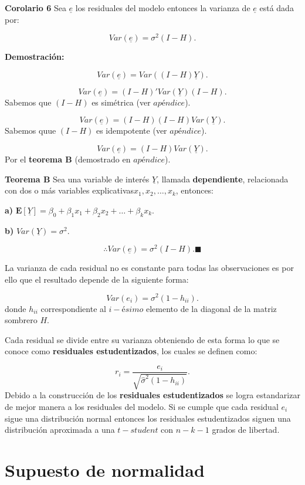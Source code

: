 \documentclass[
  a4paper,
  oneside,
  openany]{book}
\begin{document}
\textbf{Corolario 6} Sea \(\underline{e}\) los residuales del modelo entonces la varianza de \(\underline{e}\) está dada por:

\[Var(\underline{e})=\sigma^2(I-H).\]

\textbf{Demostración:}

\[Var(\underline{e})=Var((I-H)\underline{Y}).\]

\[Var(\underline{e})=(I-H)'Var(\underline{Y})(I-H).\]
Sabemos que \((I-H)\) es simétrica (ver \(apéndice\)).

\[Var(\underline{e})=(I-H)(I-H)Var(\underline{Y}).\]
Sabemos quue \((I-H)\) es idempotente (ver \(apéndice\)).

\[Var(\underline{e})=(I-H)Var(\underline{Y}).\]
Por el \textbf{teorema B} (demostrado en \(apéndice\)).

\textbf{Teorema B} Sea una variable de interés \(\underline{Y}\), llamada \textbf{dependiente}, relacionada con dos o más variables explicativas\(x_{1},x_{2},\ldots,x_{k}\),
entonces:

\textbf{a)} \(\mathbf{E}[\underline{Y}]= \beta_{0}+\beta_{1}x_{1}+\beta_{2}x_{2}+ \ldots + \beta_{k}x_{k}.\)

\textbf{b)} \(Var(\underline{Y})= \sigma^2.\)

\[\therefore Var(\underline{e})=\sigma^2(I-H). \blacksquare\]

La varianza de cada residual no es constante para todas las observaciones es por ello que el resultado depende de la siguiente forma:

\[Var(e_{i})=\sigma^2(1-h_{ii}).\]
donde \(h_{ii}\) correspondiente al \(i-ésimo\) elemento de la diagonal de la matriz sombrero \(H\).

Cada residual se divide entre su varianza obteniendo de esta forma lo que se conoce como \textbf{residuales estudentizados}, los cuales se definen como:

\[r_{i}=\frac{e_{i}}{\sqrt{\hat{\sigma}^2(1-h_{ii})}}.\]
Debido a la construcción de los \textbf{residuales estudentizados} se logra estandarizar de mejor manera a los residuales del modelo. Si se cumple que cada residual \(e_{i}\) sigue una distribución normal entonces los residuales estudentizados siguen una distribución aproximada a una \(t-student\) con \(n-k-1\) grados de libertad.

\hypertarget{supuesto-de-normalidad}{%
\section{Supuesto de normalidad}\label{supuesto-de-normalidad}}
\end{document}

